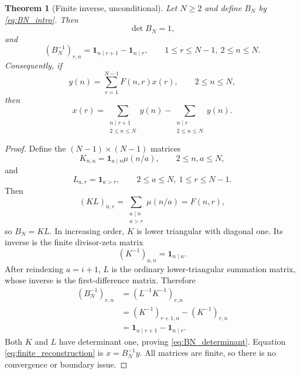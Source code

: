 \documentclass[11pt]{amsart}
\numberwithin{equation}{section}
\theoremstyle{plain}
\newtheorem{theorem}{Theorem}[section]
\theoremstyle{definition}
\theoremstyle{remark}
\newcommand{\one}{\mathbf 1}
\newcommand{\mob}{\mu}
\newcommand{\Fsurf}{F}
\begin{document}
\begin{theorem}[Finite inverse, unconditional]
\label{thm:finite_inverse}
Let $N\ge2$ and define $B_N$ by \eqref{eq:BN_intro}.  Then
\begin{equation}
\det B_N=1,
\label{eq:BN_determinant}
\end{equation}
and
\begin{equation}
(B_N^{-1})_{r,n}=\one_{n\mid r+1}-\one_{n\mid r},
\qquad
1\le r\le N-1,\ 2\le n\le N.
\label{eq:BN_inverse}
\end{equation}
Consequently, if
\begin{equation}
y(n)=\sum_{r=1}^{N-1}\Fsurf(n,r)x(r),
\qquad 2\le n\le N,
\label{eq:finite_system}
\end{equation}
then
\begin{equation}
x(r)=
\sum_{\substack{n\mid r+1\\2\le n\le N}}y(n)
-
\sum_{\substack{n\mid r\\2\le n\le N}}y(n).
\label{eq:finite_reconstruction}
\end{equation}
\end{theorem}

\begin{proof}
Define the $(N-1)\times(N-1)$ matrices
\begin{equation}
K_{n,a}=\one_{a\mid n}\mob(n/a),
\qquad 2\le n,a\le N,
\label{eq:K_definition}
\end{equation}
and
\begin{equation}
L_{a,r}=\one_{a>r},
\qquad 2\le a\le N,\ 1\le r\le N-1.
\label{eq:L_definition}
\end{equation}
Then
\begin{equation}
(KL)_{n,r}=\sum_{\substack{a\mid n\\a>r}}\mob(n/a)=\Fsurf(n,r),
\label{eq:BN_factorization}
\end{equation}
so $B_N=KL$.  In increasing order, $K$ is lower triangular with diagonal one.  Its inverse is the finite divisor-zeta matrix
\begin{equation}
(K^{-1})_{a,n}=\one_{n\mid a}.
\label{eq:K_inverse}
\end{equation}
After reindexing $a=i+1$, $L$ is the ordinary lower-triangular summation matrix, whose inverse is the first-difference matrix.  Therefore
\begin{align}
(B_N^{-1})_{r,n}
&=(L^{-1}K^{-1})_{r,n}
\label{eq:BN_inverse_factorized}\\
&=(K^{-1})_{r+1,n}-(K^{-1})_{r,n}
\label{eq:BN_inverse_difference}\\
&=\one_{n\mid r+1}-\one_{n\mid r}.
\label{eq:BN_inverse_final}
\end{align}
Both $K$ and $L$ have determinant one, proving \eqref{eq:BN_determinant}.  Equation \eqref{eq:finite_reconstruction} is $x=B_N^{-1}y$.  All matrices are finite, so there is no convergence or boundary issue.
\end{proof}
\end{document}
